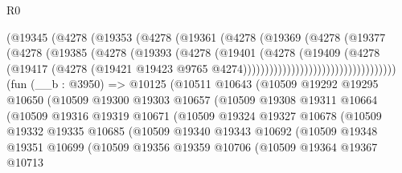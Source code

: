 \begin{lexlean}{R0}
\begin{coremodule}
                                (@19345
                                  (@4278
                                    (@19353
                                      (@4278
                                        (@19361
                                          (@4278
                                            (@19369
                                              (@4278
                                                (@19377
                                                  (@4278
                                                    (@19385
                                                      (@4278
                                                        (@19393
                                                          (@4278
                                                            (@19401
                                                              (@4278
                                                                (@19409
                                                                  (@4278
                                                                    (@19417
                                                                      (@4278
                                                                        (@19421
                                                                          @19423
                                                                          @9765
                                                                          @4274)))))))))))))))))))))))))))))))))))
    (fun (__b : @3950) =>
    @10125
      (@10511
        @10643
        (@10509
          @19292
          @19295
          @10650
          (@10509
            @19300
            @19303
            @10657
            (@10509
              @19308
              @19311
              @10664
              (@10509
                @19316
                @19319
                @10671
                (@10509
                  @19324
                  @19327
                  @10678
                  (@10509
                    @19332
                    @19335
                    @10685
                    (@10509
                      @19340
                      @19343
                      @10692
                      (@10509
                        @19348
                        @19351
                        @10699
                        (@10509
                          @19356
                          @19359
                          @10706
                          (@10509
                            @19364
                            @19367
                            @10713

\end{coremodule}
\end{lexlean}
